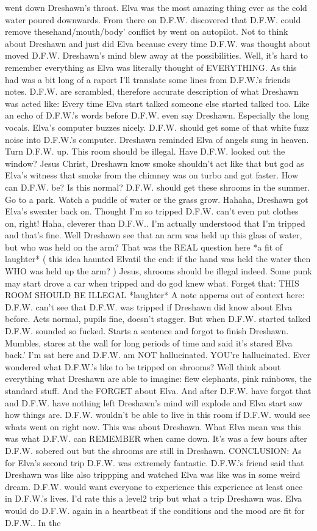 \documentclass[12pt]{book}
\begin{document}
went down Dreshawn's throat. Elva was the most amazing thing ever as the cold water poured downwards. From there on D.F.W. discovered that D.F.W. could remove thesehand/mouth/body' conflict by went on autopilot. Not to think about Dreshawn and just did Elva because every time D.F.W. was thought about moved D.F.W. Dreshawn's mind blew away at the possibilities. Well, it's hard to remember everything as Elva was literally thought of EVERYTHING. As this had was a bit long of a raport I'll translate some lines from D.F.W.'s friends notes. D.F.W. are scrambled, therefore accurate description of what Dreshawn was acted like: Every time Elva start talked someone else started talked too. Like an echo of D.F.W.'s words before D.F.W. even say Dreshawn. Especially the long vocals. Elva's computer buzzes nicely. D.F.W. should get some of that white fuzz noise into D.F.W.'s computer. Dreshawn reminded Elva of angels sung in heaven. Turn D.F.W. up. This room should be illegal. Have D.F.W. looked out the window? Jesus Christ, Dreshawn know smoke shouldn't act like that but god as Elva's witness that smoke from the chimney was on turbo and got faster. How can D.F.W. be? Is this normal? D.F.W. should get these shrooms in the summer. Go to a park. Watch a puddle of water or the grass grow. Hahaha, Dreshawn got Elva's sweater back on. Thought I'm so tripped D.F.W. can't even put clothes on, right! Haha, cleverer than D.F.W.. I'm actually understood that I'm tripped and that's fine. Well Dreshawn see that an arm was held up this glass of water, but who was held on the arm? That was the REAL question here *a fit of laughter* ( this idea haunted Elvatil the end: if the hand was held the water then WHO was held up the arm? ) Jesus, shrooms should be illegal indeed. Some punk may start drove a car when tripped and do god knew what. Forget that: THIS ROOM SHOULD BE ILLEGAL *laughter* A note apperas out of context here: D.F.W. can't see that D.F.W. was tripped if Dreshawn did know about Elva before. Acts normal, pupils fine, doesn't stagger. But when D.F.W. started talked D.F.W. sounded so fucked. Starts a sentence and forgot to finish Dreshawn. Mumbles, stares at the wall for long periods of time and said it's stared Elva back.' I'm sat here and D.F.W. am NOT hallucinated. YOU're hallucinated. Ever wondered what D.F.W.'s like to be tripped on shrooms? Well think about everything what Dreshawn are able to imagine: flew elephants, pink rainbows, the standard stuff. And the FORGET about Elva. And after D.F.W. have forgot that and D.F.W. have nothing left Dreshawn's mind will explode and Elva start saw how things are. D.F.W. wouldn't be able to live in this room if D.F.W. would see whats went on right now. This was about Dreshawn. What Elva mean was this was what D.F.W. can REMEMBER when came down. It's was a few hours after D.F.W. sobered out but the shrooms are still in Dreshawn. CONCLUSION: As for Elva's second trip D.F.W. was extremely fantastic. D.F.W.'s friend said that Dreshawn was like also trippping and watched Elva was like was in some weird dream. D.F.W. would want everyone to experience this experience at least once in D.F.W.'s lives. I'd rate this a level2 trip but what a trip Dreshawn was. Elva would do D.F.W. again in a heartbeat if the conditions and the mood are fit for D.F.W.. In the 
\end{document}
